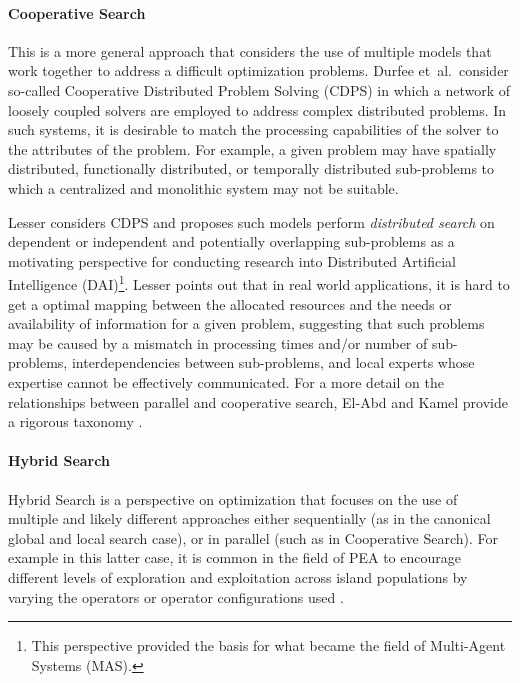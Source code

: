 \paragraph{Cooperative Search}
This is a more general approach that considers the use of multiple models that work together to address a difficult optimization problems. Durfee et~al.\ consider so-called Cooperative Distributed Problem Solving (CDPS) in which a network of loosely coupled solvers are employed to address complex distributed problems. In such systems, it is desirable to match the processing capabilities of the solver to the attributes of the problem. For example, a given problem may have spatially distributed, functionally distributed, or temporally distributed sub-problems to which a centralized and monolithic system may not be suitable. 

Lesser \cite{Lesser1990} considers CDPS and proposes such models perform \emph{distributed search} on dependent or independent and potentially overlapping sub-problems as a motivating perspective for conducting research into Distributed Artificial Intelligence (DAI)\footnote{This perspective provided the basis for what became the field of Multi-Agent Systems (MAS).}. Lesser points out that in real world applications, it is hard to get a optimal mapping between the allocated resources and the needs or availability of information for a given problem, suggesting that such problems may be caused by a mismatch in processing times and/or number of sub-problems, interdependencies between sub-problems, and local experts whose expertise cannot be effectively communicated. For a more detail on the relationships between parallel and cooperative search, El-Abd and Kamel provide a rigorous taxonomy \cite{El-Abd2005}.
	
\paragraph{Hybrid Search}
Hybrid Search is a perspective on optimization that focuses on the use of multiple and likely different approaches either sequentially (as in the canonical global and local search case), or in parallel (such as in Cooperative Search). For example in this latter case, it is common in the field of PEA to encourage different levels of exploration and exploitation across island populations by varying the operators or operator configurations used \cite{Tanese1989, Adamidis1996}. 

